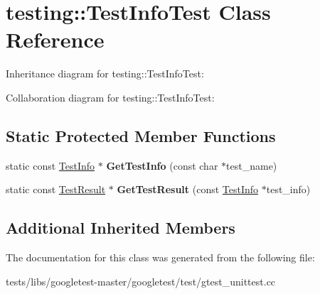 \hypertarget{classtesting_1_1TestInfoTest}{}\section{testing\+:\+:Test\+Info\+Test Class Reference}
\label{classtesting_1_1TestInfoTest}


Inheritance diagram for testing\+:\+:Test\+Info\+Test\+:


Collaboration diagram for testing\+:\+:Test\+Info\+Test\+:
\subsection*{Static Protected Member Functions}
\begin{DoxyCompactItemize}
\item 
\mbox{\label{classtesting_1_1TestInfoTest_a4140c1302bf53c7f1375a23923624f04}} 
static const \hyperlink{classtesting_1_1TestInfo}{Test\+Info} $\ast$ {\bfseries Get\+Test\+Info} (const char $\ast$test\+\_\+name)
\item 
\mbox{\label{classtesting_1_1TestInfoTest_a154b3679b1aa00ad037ce46eb60d18c3}} 
static const \hyperlink{classtesting_1_1TestResult}{Test\+Result} $\ast$ {\bfseries Get\+Test\+Result} (const \hyperlink{classtesting_1_1TestInfo}{Test\+Info} $\ast$test\+\_\+info)
\end{DoxyCompactItemize}
\subsection*{Additional Inherited Members}


The documentation for this class was generated from the following file\+:\begin{DoxyCompactItemize}
\item 
tests/libs/googletest-\/master/googletest/test/gtest\+\_\+unittest.\+cc\end{DoxyCompactItemize}
